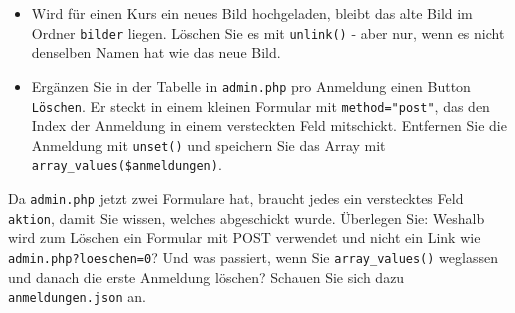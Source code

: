 \documentclass[a4paper,12pt]{article}
\begin{document}
\begin{itemize}
    \item Wird für einen Kurs ein neues Bild hochgeladen, bleibt das alte Bild im Ordner \texttt{bilder} liegen. Löschen Sie es mit \texttt{unlink()} - aber nur, wenn es nicht denselben Namen hat wie das neue Bild.
    \item Ergänzen Sie in der Tabelle in \texttt{admin.php} pro Anmeldung einen Button \texttt{Löschen}. Er steckt in einem kleinen Formular mit \texttt{method="{}post"{}}, das den Index der Anmeldung in einem versteckten Feld mitschickt. Entfernen Sie die Anmeldung mit \texttt{unset()} und speichern Sie das Array mit \texttt{array\_values(\$anmeldungen)}.
\end{itemize}

Da \texttt{admin.php} jetzt zwei Formulare hat, braucht jedes ein verstecktes Feld \texttt{aktion}, damit Sie wissen, welches abgeschickt wurde. Überlegen Sie: Weshalb wird zum Löschen ein Formular mit POST verwendet und nicht ein Link wie \texttt{admin.php?loeschen=0}? Und was passiert, wenn Sie \texttt{array\_values()} weglassen und danach die erste Anmeldung löschen? Schauen Sie sich dazu \texttt{anmeldungen.json} an.
\end{document}
